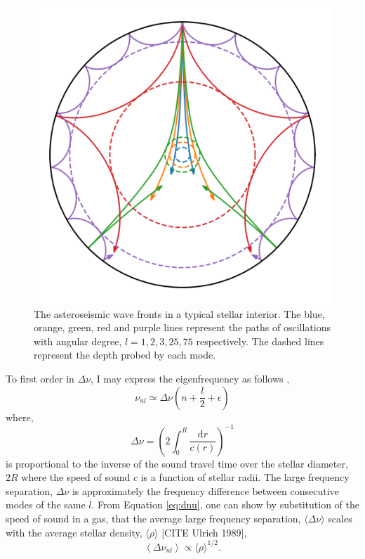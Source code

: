 \begin{figure}[ht]
    \centering
    \includegraphics[width=.7\linewidth]{introduction/images/seismo_wavefronts.png}
    \caption{The asteroseismic wave fronts in a typical stellar interior. The blue, orange, green, red and purple lines represent the paths of oscillations with angular degree, $l=1,2,3,25,75$ respectively. The dashed lines represent the depth probed by each mode.}
    \label{fig:waves}
\end{figure}

To first order in $\Delta\nu$, I may express the eigenfrequency as follows \citep{Mosser.Belkacem.ea2011},
%
\begin{equation}
    \nu_{nl} \simeq \Delta \nu\left(n+ \frac{l}{2} + \epsilon\right)
\end{equation}
%
where,
%
\begin{equation}
    \Delta \nu = \left(2 \int_{0}^{R} \frac{\mathrm{d} r}{c(r)}\right)^{-1}
    \label{eq:dnu}
\end{equation}
%
is proportional to the inverse of the sound travel time over the stellar diameter, $2R$ where the speed of sound $c$ is a function of stellar radii. The large frequency separation, $\Delta\nu$ is approximately the frequency difference between consecutive modes of the same $l$. From Equation \ref{eq:dnu}, one can show by substitution of the speed of sound in a gas, that the average large frequency separation, $\langle \Delta \nu \rangle$ scales with the average stellar density, $\langle\rho\rangle$ [CITE Ulrich 1989],
%
\begin{equation}
    \left\langle\Delta \nu_{n l}\right\rangle \propto \langle\rho\rangle^{1 / 2}.
\end{equation}
%

